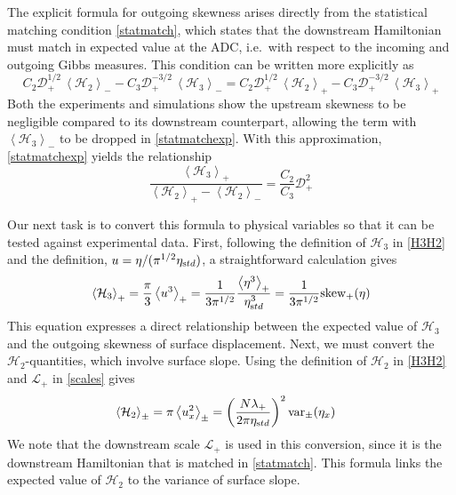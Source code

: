 \documentclass[11pt]{article}
\newcommand{\mean}[1]{\left< #1 \right>}
\newcommand{\etastd}{\eta_{\text std}}
\newcommand{\lam}{\lambda}
\newcommand{\lamdn}{\lam_{+}}
\newcommand{\lamfac}{N}
\newcommand{\drat}{\mathcal{D}}
\newcommand{\dratdn}{\drat_+}
\newcommand{\skw}{\text{skew}}
\newcommand{\skwdn}{\skw_+}
\newcommand{\var}{\text{var}}
\newcommand{\varupdn}{\var_{\pm}}
\newcommand{\lengthscale}{\mathcal{L}}
\newcommand{\Ham}{\mathcal{H}}
\newcommand{\Hthree}{\Ham_{3}}
\newcommand{\Htwo}{\Ham_{2}}
\newcommand{\meanup}[1]{\mean{#1}_{-}}
\newcommand{\meandn}[1]{\mean{#1}_{+}}
\newcommand{\meanupdn}[1]{\mean{#1}_{\pm}}
\begin{document}
The explicit formula for outgoing skewness arises directly from the statistical matching condition \eqref{statmatch}, which states that the downstream Hamiltonian must match in expected value at the ADC, i.e.~with respect to the incoming and outgoing Gibbs measures.
This condition can be written more explicitly as
\begin{equation}
\label{statmatchexp}
C_2 \dratdn^{1/2} \, \meanup{\Htwo} - C_3 \dratdn^{-3/2} \, \meanup{\Hthree } = 
C_2 \dratdn^{1/2} \, \meandn{\Htwo} - C_3 \dratdn^{-3/2} \, \meandn{\Hthree }
\end{equation}
Both the experiments and simulations show the upstream skewness to be negligible compared to its downstream counterpart, allowing the term with $\meanup{\Hthree }$ to be dropped in \eqref{statmatchexp}. With this approximation, \eqref{statmatchexp} yields the relationship
\begin{equation}
\label{H3H2ratio}
\frac{\meandn{\Hthree}} {\meandn{\Htwo} - \meanup{\Htwo}} = \frac{C_2}{C_3} \dratdn^2
\end{equation}

	Our next task is to convert this formula to physical variables so that it can be tested against experimental data. First, following the definition of $\Hthree$ in \eqref{H3H2} and the definition, $u = \eta/(\pi^{1/2} \etastd)$, a straightforward calculation gives
\begin{align}
\label{H3convert}
\meandn{\Hthree} = \frac{\pi}{3} \meandn{u^3} = 
\frac{1}{3 \pi^{1/2}} \frac{\meandn{\eta^3}}{ \etastd^3} = 
\frac{1}{3 \pi^{1/2}} \skwdn(\eta)
\end{align}
This equation expresses a direct relationship between the expected value of $\Hthree$ and the outgoing skewness of surface displacement. Next, we must convert the $\Htwo$-quantities, which involve surface slope. 
Using the definition of $\Htwo$ in \eqref{H3H2} and $\lengthscale_+$ in \eqref{scales} gives
\begin{align}
\label{H2convert}
&\meanupdn{\Htwo} = \pi \meanupdn{ u_x^2} = 
\left( \frac{\lamfac \lamdn}{2 \pi \etastd} \right)^2 \varupdn(\eta_x)
\end{align}
We note that the downstream scale $\lengthscale_+$ is used in this conversion, since it is the downstream Hamiltonian that is matched in \eqref{statmatch}. This formula links the expected value of $\Htwo$ to the variance of surface slope.
\end{document}
